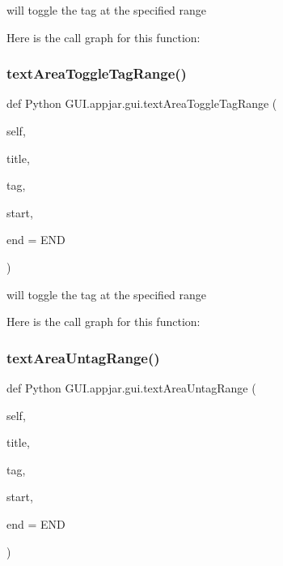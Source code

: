 \begin{DoxyVerb}
\begin{DoxyVerb}will toggle the tag at the specified range \end{DoxyVerb}
 Here is the call graph for this function\+:
\mbox{\label{class_python_01_g_u_i_1_1appjar_1_1gui_ae0713bb69c5572ceca600ac6e24454d9}} 
\subsubsection{\texorpdfstring{text\+Area\+Toggle\+Tag\+Range()}{textAreaToggleTagRange()}}
{\footnotesize\ttfamily def Python G\+U\+I.\+appjar.\+gui.\+text\+Area\+Toggle\+Tag\+Range (\begin{DoxyParamCaption}\item[{}]{self,  }\item[{}]{title,  }\item[{}]{tag,  }\item[{}]{start,  }\item[{}]{end = {\ttfamily END} }\end{DoxyParamCaption})}

\begin{DoxyVerb}will toggle the tag at the specified range \end{DoxyVerb}
 Here is the call graph for this function\+:
\mbox{\label{class_python_01_g_u_i_1_1appjar_1_1gui_a568d8cbcfaa3fe2472d9846f69f69aa5}} 
\subsubsection{\texorpdfstring{text\+Area\+Untag\+Range()}{textAreaUntagRange()}}
{\footnotesize\ttfamily def Python G\+U\+I.\+appjar.\+gui.\+text\+Area\+Untag\+Range (\begin{DoxyParamCaption}\item[{}]{self,  }\item[{}]{title,  }\item[{}]{tag,  }\item[{}]{start,  }\item[{}]{end = {\ttfamily END} }\end{DoxyParamCaption})}


\end{DoxyVerb}
